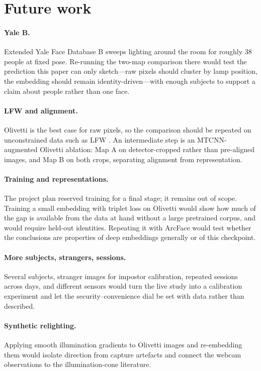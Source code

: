 \section{Future work}\label{sec:future}

\paragraph{Yale B.} Extended Yale Face Database B \citep{georghiades2001} sweeps lighting around the room for roughly 38 people at fixed pose. Re-running the two-map comparison there would test the prediction this paper can only sketch---raw pixels should cluster by lamp position, the embedding should remain identity-driven---with enough subjects to support a claim about people rather than one face.

\paragraph{LFW and alignment.} Olivetti is the best case for raw pixels, so the comparison should be repeated on unconstrained data such as LFW \citep{huang2007}. An intermediate step is an MTCNN-augmented Olivetti ablation: Map A on detector-cropped rather than pre-aligned images, and Map B on both crops, separating alignment from representation.

\paragraph{Training and representations.} The project plan reserved training for a final stage; it remains out of scope. Training a small embedding with triplet loss on Olivetti would show how much of the gap is available from the data at hand without a large pretrained corpus, and would require held-out identities. Repeating it with ArcFace \citep{deng2019} would test whether the conclusions are properties of deep embeddings generally or of this checkpoint.

\paragraph{More subjects, strangers, sessions.} Several subjects, stranger images for impostor calibration, repeated sessions across days, and different sensors would turn the live study into a calibration experiment and let the security--convenience dial be set with data rather than described.

\paragraph{Synthetic relighting.} Applying smooth illumination gradients to Olivetti images and re-embedding them would isolate direction from capture artefacts and connect the webcam observations to the illumination-cone literature.
